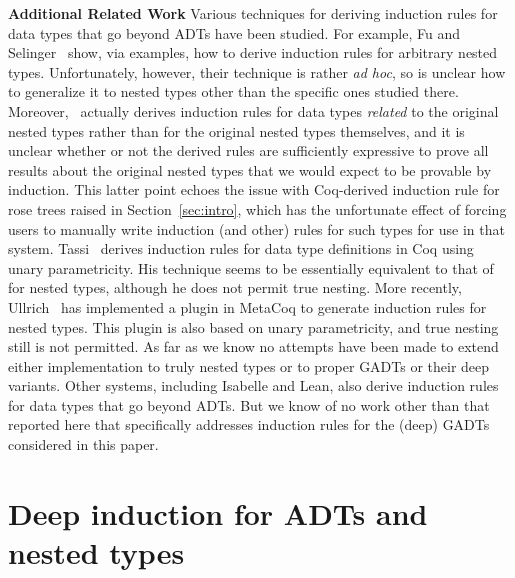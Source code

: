 \documentclass[sigplan,10pt]{acmart}
\begin{document}

{\bf Additional Related Work\/} Various techniques for deriving
induction rules for data types that go beyond ADTs have been
studied. For example, Fu and Selinger~\cite{fs18} show, via examples,
how to derive induction rules for arbitrary nested
types. Unfortunately, however, their technique is rather {\em ad hoc},
so is unclear how to generalize it to nested types other than the
specific ones studied there. Moreover,~\cite{fs18} actually derives
induction rules for data types {\em related} to the original nested
types rather than for the original nested types themselves, and it is
unclear whether or not the derived rules are sufficiently expressive
to prove all results about the original nested types that we would
expect to be provable by induction. This latter point echoes the issue
with Coq-derived induction rule for rose trees raised in
Section~\ref{sec:intro}, which has the unfortunate effect of forcing
users to manually write induction (and other) rules for such types for
use in that system. Tassi~\cite{tas19} derives induction rules for
data type definitions in Coq using unary parametricity. His technique
seems to be essentially equivalent to that of~\cite{jp19} for nested
types, although he does not permit true nesting. More recently,
Ullrich~\cite{ull20} has implemented a plugin in MetaCoq to generate
induction rules for nested types. This plugin is also based on unary
parametricity, and true nesting still is not permitted.  As far as we
know no attempts have been made to extend either implementation to
truly nested types or to proper GADTs or their deep variants.  Other
systems, including Isabelle and Lean, also derive induction rules for
data types that go beyond ADTs.  But we know of no work other than
that reported here that specifically addresses induction rules for the
(deep) GADTs considered in this paper.

\section{Deep induction for ADTs and nested types}\label{sec:ADTs-and-nesteds}
\end{document}
